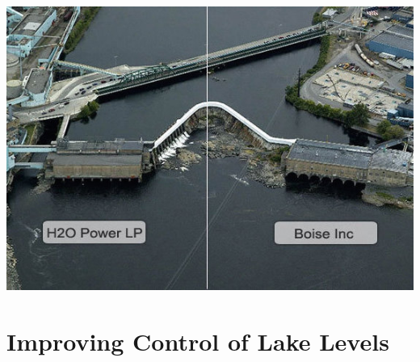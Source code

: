 \documentclass[compress,english]{beamer}
\begin{document}

{\usebackgroundtemplate%
	{\includegraphics[height=\paperheight]{fort-frances-split.jpg}}
\section{Improving Control of Lake Levels}
}
\end{document}
